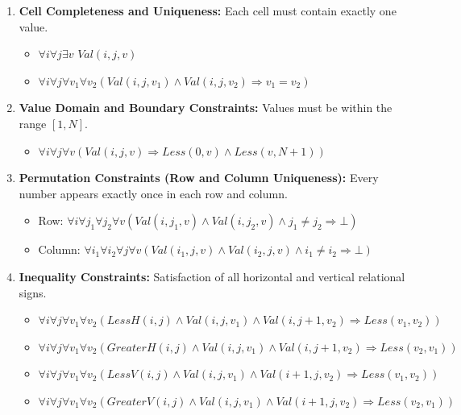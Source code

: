\begin{enumerate}
    \item \textbf{Cell Completeness and Uniqueness:} Each cell must contain exactly one value.
    \begin{itemize}
        \item $\forall i \forall j \exists v$ $Val(i, j, v)$
        \item $\forall i \forall j \forall v_1 \forall v_2 (Val(i, j, v_1) \wedge Val(i, j, v_2) \Rightarrow v_1 = v_2)$
    \end{itemize}

    \item \textbf{Value Domain and Boundary Constraints:} Values must be within the range $[1, N]$.
    \begin{itemize}
        \item $\forall i \forall j \forall v (Val(i, j, v) \Rightarrow Less(0, v) \wedge Less(v, N+1))$
    \end{itemize}

    \item \textbf{Permutation Constraints (Row and Column Uniqueness):} Every number appears exactly once in each row and column.
    \begin{itemize}
        \item Row: $\forall i \forall j_1 \forall j_2 \forall v (Val(i, j_1, v) \wedge Val(i, j_2, v) \wedge j_1 \neq j_2 \Rightarrow \bot)$
        \item Column: $\forall i_1 \forall i_2 \forall j \forall v (Val(i_1, j, v) \wedge Val(i_2, j, v) \wedge i_1 \neq i_2 \Rightarrow \bot)$
    \end{itemize}

    \item \textbf{Inequality Constraints:} Satisfaction of all horizontal and vertical relational signs.
    \begin{itemize}
        \item $\forall i \forall j \forall v_1 \forall v_2 (LessH(i, j) \wedge Val(i, j, v_1) \wedge Val(i, j+1, v_2) \Rightarrow Less(v_1, v_2))$
        \item $\forall i \forall j \forall v_1 \forall v_2 (GreaterH(i, j) \wedge Val(i, j, v_1) \wedge Val(i, j+1, v_2) \Rightarrow Less(v_2, v_1))$
        \item $\forall i \forall j \forall v_1 \forall v_2 (LessV(i, j) \wedge Val(i, j, v_1) \wedge Val(i+1, j, v_2) \Rightarrow Less(v_1, v_2))$
        \item $\forall i \forall j \forall v_1 \forall v_2 (GreaterV(i, j) \wedge Val(i, j, v_1) \wedge Val(i+1, j, v_2) \Rightarrow Less(v_2, v_1))$
    \end{itemize}


\end{enumerate}
